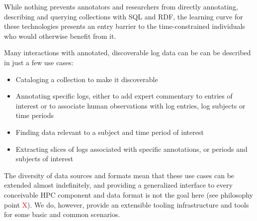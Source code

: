 \begin{enumerate}
      While nothing prevents annotators and researchers from directly 
      annotating, describing and querying collections with SQL and RDF, 
      the learning curve for these technologies presents an entry 
      barrier to the time-constrained individuals who would otherwise
      benefit from it. 
      
      Many interactions with annotated, discoverable log data can be 
      can be described in just a few use cases:
      
\begin{itemize}
\item Cataloging a collection to make it discoverable
\item Annotating specific logs, either to add expert commentary to 
      entries of interest or to associate human observations with log 
      entries, log subjects or time periods
\item Finding data relevant to a subject and time period of interest
\item Extracting slices of logs associated with specific annotations, 
      or periods and subjects of interest
\end{itemize}

     The diversity of data sources and formats mean that these use cases 
     can be extended almost indefinitely, and providing a generalized 
     interface to every conceivable HPC component and data format is 
     not the goal here (see philosophy point \textcolor{red}{X}). We 
     do, however, provide an extensible tooling infrastructure and tools
     for some basic and common scenarios.

\end{enumerate}









